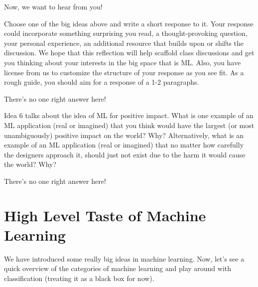 \documentclass[assignment01_Solutions]{subfiles}
\begin{document}
\begin{exercise}
Now, we want to hear from you!  
\bes
\item Choose one of the big ideas above and write a short response to it.  Your response could incorporate something surprising you read, a thought-provoking question, your personal experience, an additional resource that builds upon or shifts the discussion.  We hope that this reflection will help scaffold class discussions and get you thinking about your interests in the big space that is ML.  Also, you have license from us to customize the structure of your response as you see fit.  As a rough guide, you should aim for a response of a 1-2 paragraphs.

\begin{boxedsolution}
There's no one right answer here!
\end{boxedsolution}

\item Idea 6 talks about the idea of ML for positive impact.  What is one example of an ML application (real or imagined) that you think would have the largest (or most unambiguously) positive impact on the world?  Why?  Alternatively, what is an example of an ML application (real or imagined) that no matter how carefully the designers approach it, should just not exist due to the harm it would cause the world?  Why?

\begin{boxedsolution}
There's no one right answer here!
\end{boxedsolution}

\ees
\end{exercise}

\section{High Level Taste of Machine Learning}

We have introduced some really big ideas in machine learning. Now, let's see a quick overview of the categories of machine learning and play around with classification (treating it as a black box for now).  
\end{document}
